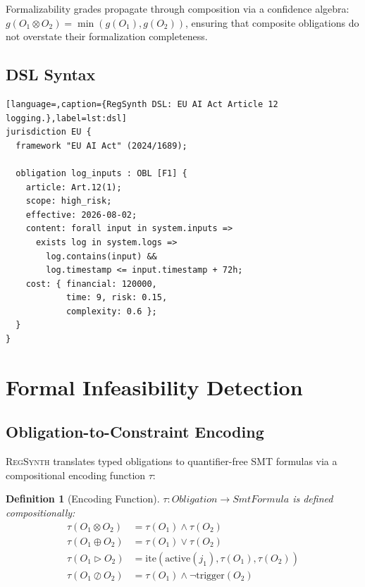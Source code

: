 \documentclass[11pt,twocolumn]{article}
\newtheorem{definition}{Definition}
\newcommand{\regsynth}{\textsc{RegSynth}}
\newcommand{\tensor}{\otimes}
\newcommand{\disjunction}{\oplus}
\newcommand{\override}{\triangleright}
\newcommand{\except}{\oslash}
\begin{document}
Formalizability grades propagate through composition via a confidence algebra:
$g(O_1 \tensor O_2) = \min(g(O_1), g(O_2))$, ensuring that composite obligations
do not overstate their formalization completeness.

\subsection{DSL Syntax}

\begin{lstlisting}[language=,caption={RegSynth DSL: EU AI Act Article 12 logging.},label=lst:dsl]
jurisdiction EU {
  framework "EU AI Act" (2024/1689);

  obligation log_inputs : OBL [F1] {
    article: Art.12(1);
    scope: high_risk;
    effective: 2026-08-02;
    content: forall input in system.inputs =>
      exists log in system.logs =>
        log.contains(input) &&
        log.timestamp <= input.timestamp + 72h;
    cost: { financial: 120000,
            time: 9, risk: 0.15,
            complexity: 0.6 };
  }
}
\end{lstlisting}

\section{Formal Infeasibility Detection}
\label{sec:infeasibility}

\subsection{Obligation-to-Constraint Encoding}

\regsynth{} translates typed obligations to quantifier-free SMT formulas via a
compositional encoding function $\tau$:

\begin{definition}[Encoding Function]
$\tau : \textit{Obligation} \to \textit{SmtFormula}$ is defined compositionally:
\begin{align*}
\tau(O_1 \tensor O_2) &= \tau(O_1) \wedge \tau(O_2) \\
\tau(O_1 \disjunction O_2) &= \tau(O_1) \vee \tau(O_2) \\
\tau(O_1 \override O_2) &= \text{ite}(\text{active}(j_1), \tau(O_1), \tau(O_2)) \\
\tau(O_1 \except O_2) &= \tau(O_1) \wedge \neg\text{trigger}(O_2)
\end{align*}
\end{definition}
\end{document}
